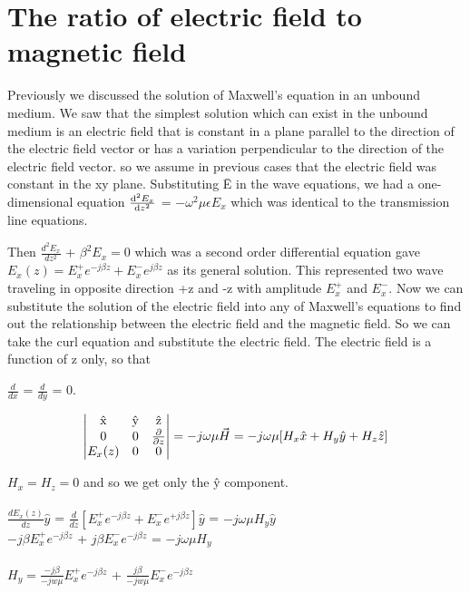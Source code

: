 \chapter{The ratio of electric field to magnetic field}\label{lec:lec22}
Previously we discussed the solution of Maxwell's equation in an unbound medium. We saw that the simplest solution which can exist in the unbound medium is an electric field that is constant in a plane parallel to the direction of the electric field vector or has a variation perpendicular to the direction of the electric field vector. so we assume in previous cases that the electric field was constant in the xy plane. Substituting \={E} in the wave equations, we had a one-dimensional equation $\dv[2]{E_x}{z}$ = $-\omega^2\mu\epsilon E_x$ which was identical to the transmission line equations. 

Then $\frac{d^2E_x}{dz^2}$ + $\beta^2 E_x = 0$ which was a second order differential equation gave $E_x({z}) = E_x^{+}e^{-j\beta z} + E_x^{-}e^{j\beta z}$ as its general solution. This represented two wave traveling in opposite direction +z and -z with amplitude $E_x^{+}$ and $E_x^{-}$. Now we can substitute the solution of the electric field into any of Maxwell's equations to find out the relationship between the electric field and the magnetic field. So we can take the curl equation and substitute the electric field. The electric field is a function of z only, so that

$\frac{d}{dx}$ = $\frac{d}{dy}$ = 0.


\begin{dmath*}
\begin{vmatrix}
$\^{x}$ & $\^{y}$ & $\^{z}$\\
0 & 0 & \pdv{}{z} \\
$$E_{x}(z)$$ & 0 & 0
\end{vmatrix} =-j\omega\mu\vec{H} =-j\omega\mu[H_x\hat{x} + H_y\hat{y} + H_z\hat{z}]
\end{dmath*}

$H_x = H_z = 0$ and so we get only the \^{y} component.\\
\\
$\frac{dE_x(z)}{dz}\hat{y}$ = $\frac{d}{dz}[E_x^+e^{-j\beta z} + E_x^-e^{+j\beta z}]\hat{y}$ = $-j\omega\mu H_y\hat{y}$\\

$-j\beta E_x^+e^{-j\beta z}$ + $j\beta E_x^-e^{-j\beta z}$ = $-j\omega\mu H_y$\\
\\
$H_y = \frac{-j\beta}{-jw\mu}E_x^{+}e^{-j\beta z}$ + $\frac{j\beta}{-jw\mu}E_x^{-}e^{-j\beta z}$

